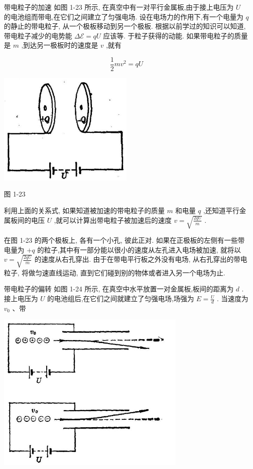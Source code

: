 \documentclass[10pt]{article}
\begin{document}
带电粒子的加速 如图 1-23 所示, 在真空中有一对平行金属板,由于接上电压为 \(U\) 的电池组而带电,在它们之间建立了匀强电场. 设在电场力的作用下,有一个电量为 \(q\) 的静止的带电粒子, 从一个极板移动到另一个极板. 根据以前学过的知识可以知道, 带电粒子减少的电势能 \(\Delta \mathcal{E} = {qU}\) 应该等. 于粒子获得的动能. 如果带电粒子的质量是 \(m\) ,到达另一极板时的速度是 \(v\) ,就有

\[
\frac{1}{2}m{v}^{2} = {qU}
\]

\begin{center}
\includegraphics[max width=0.5\textwidth]{images/01913056-1f15-74d8-9184-9aab52c9d66b_37_632735.jpg}
\end{center}

图 1-23

利用上面的关系式, 如果知道被加速的带电粒子的质量 \(m\) 和电量 \(q\) ,还知道平行金属板间的电压 \(U\) ,就可以计算出带电粒子被加速后的速度 \(v = \sqrt{\frac{2qU}{m}}\) .

在图 1-23 的两个极板上, 各有一个小孔, 彼此正对. 如果在正极板的左侧有一些带电量为 \(+ q\) 的粒子,其中有一部分能以很小的速度从左孔进入电场被加速, 就将以 \(v = \sqrt{\frac{2qU}{m}}\) 的速度从右孔穿出. 由于在带电平行板之外没有电场, 从右孔穿出的带电粒子, 将做匀速直线运动, 直到它们碰到别的物体或者进入另一个电场为止.

带电粒子的偏转 如图 1-24 所示, 在真空中水平放置一对金属板,板间的距离为 \(d\) . 接上电压为 \(U\) 的电池组后,在它们之间就建立了匀强电场,场强为 \(E = \frac{U}{d}\) . 当速度为 \({v}_{0}\) 、带

\begin{center}
\includegraphics[max width=0.7\textwidth]{images/01913056-1f15-74d8-9184-9aab52c9d66b_38_644084.jpg}
\end{center}
\end{document}
